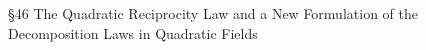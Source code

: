 §46 The Quadratic Reciprocity Law and a New Formulation of the Decomposition Laws in Quadratic Fields

